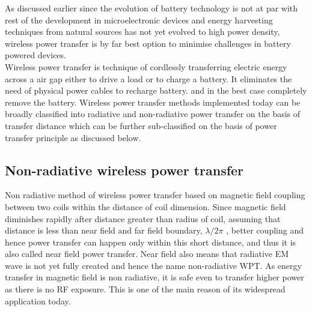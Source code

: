 \documentclass[12pt,a4paper,UKenglish]{report}
\begin{document}
As discussed earlier since the evolution of battery technology is not at par with rest of the development in 
microelectronic devices and energy harvesting techniques from natural sources has not yet evolved to high power
density, wireless power transfer is by far best option to minimise challenges in battery powered devices. \\

Wireless power transfer is technique of cordlessly transferring electric energy across a air gap either to drive 
a load or to charge a battery. It eliminates the need of physical power cables to recharge battery. and in the 
best case completely remove the battery. Wireless power transfer methods implemented today can be broadly 
classified into radiative and non-radiative power transfer on the basis of transfer distance which can be further 
sub-classified on the basis of power transfer principle \cite{wpt_fund_std} as discussed below.\\


\subsection{Non-radiative wireless power transfer}

Non radiative method of wireless power transfer based on magnetic field coupling between two coils within the distance of coil dimension. Since magnetic field diminishes rapidly after distance greater than radius of coil, assuming that distance is less than near field and far field boundary, $\lambda /2\pi$  \cite[pp. 63]{rfid_2010}, better coupling and hence power transfer can happen only within this short distance, and thus it is also called near field power transfer. Near field also means that radiative EM wave is not yet fully created and hence the name non-radiative WPT. As energy transfer in magnetic field is non radiative, it is safe even to transfer higher power as there is no RF exposure. This is one of the main reason of its widespread application today. \\
\end{document}
